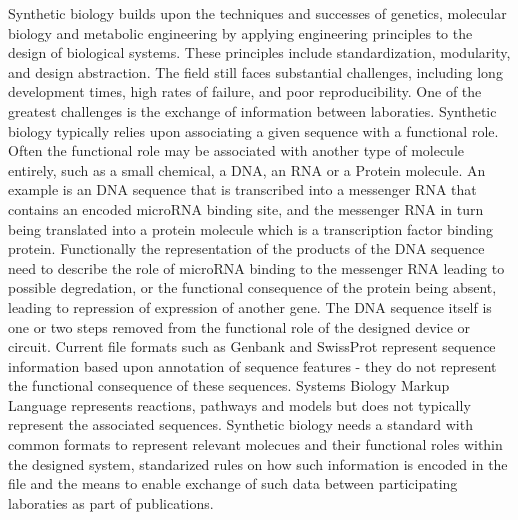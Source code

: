 Synthetic biology builds upon the techniques and successes of genetics, molecular biology and metabolic engineering by applying engineering principles to the design of biological systems. These principles include standardization, modularity, and design abstraction. The field still faces substantial challenges, including long development times, high rates of failure, and poor reproducibility. One of the greatest challenges is the exchange of information between laboraties. Synthetic biology typically relies upon associating a given sequence with a functional role. Often the functional role may be associated with another type of molecule entirely, such as a small chemical, a DNA, an RNA or a Protein molecule. An example is an DNA sequence that is transcribed into a messenger RNA that contains an encoded microRNA binding site, and the messenger RNA in turn being translated into a protein molecule which is a transcription factor binding protein. Functionally the representation of the products of the DNA sequence need to describe the role of microRNA binding to the messenger RNA leading to possible  degredation, or the functional consequence of the protein being absent, leading to repression of expression of another gene. The DNA sequence itself is one or two steps removed from the functional role of the designed device or circuit. Current file formats such as Genbank and SwissProt represent sequence information based upon annotation of sequence features - they do not represent the functional consequence of these sequences. Systems Biology Markup Language represents reactions, pathways and models but does not typically represent the associated sequences. Synthetic biology needs a standard with common formats to represent relevant molecues and their functional roles within the designed system, standarized rules on how such information is encoded in the file and the means to enable exchange of such data between participating laboraties as part of publications. 


